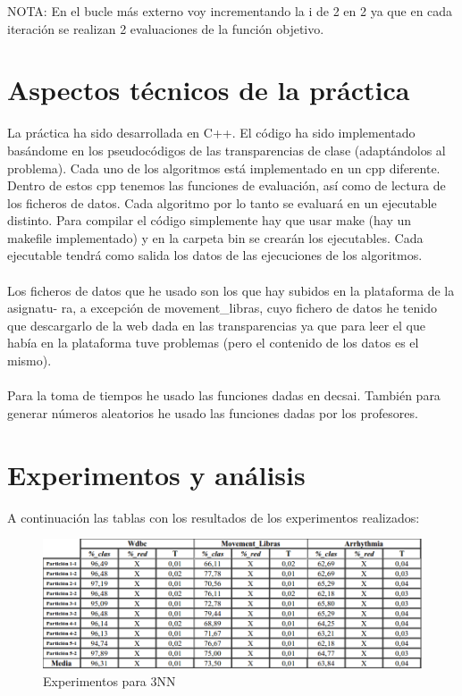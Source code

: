 NOTA: En el bucle más externo voy incrementando la i de 2 en 2 ya que en cada iteración se realizan 2 evaluaciones de la función objetivo.

\section{Aspectos técnicos de la práctica}
La práctica ha sido desarrollada en C++. El código ha sido implementado basándome en los
pseudocódigos de las transparencias de clase (adaptándolos al problema). Cada uno de los algoritmos está implementado en un cpp diferente. Dentro de estos cpp tenemos las funciones de
evaluación, así como de lectura de los ficheros de datos. Cada algoritmo por lo tanto se evaluará
en un ejecutable distinto. Para compilar el código simplemente hay que usar make (hay un makefile implementado) y en la carpeta bin se crearán los ejecutables. Cada ejecutable tendrá como
salida los datos de las ejecuciones de los algoritmos.
\\
\\
Los ficheros de datos que he usado son los que hay subidos en la plataforma de la asignatu-
ra, a excepción de movement\_libras, cuyo fichero de datos he tenido que descargarlo de la web
dada en las transparencias ya que para leer el que había en la plataforma tuve problemas (pero
el contenido de los datos es el mismo).
\\
\\
Para la toma de tiempos he usado las funciones dadas en decsai. También para generar números
aleatorios he usado las funciones dadas por los profesores.

\section{Experimentos y análisis}
A continuación las tablas con los resultados de los experimentos realizados:
\begin{figure} [H]
\centering
\includegraphics[width=1.0\linewidth]{3NN}
\caption{Experimentos para 3NN}
\label{fig:3NN}
\end{figure}


